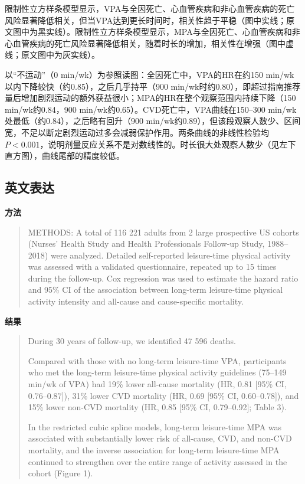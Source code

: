 限制性立方样条模型显示，VPA与全因死亡、心血管疾病和非心血管疾病的死亡风险显著降低相关，但当VPA达到更长时间时，相关性趋于平稳（图中实线；原文图中为黑实线）。限制性立方样条模型显示，MPA与全因死亡、心血管疾病和非心血管疾病的死亡风险显著降低相关，随着时长的增加，相关性在增强（图中虚线；原文图中为灰实线）。
\begin{annotation}
以“不运动”（0 min/wk）为参照读图：全因死亡中，VPA的HR在约150 min/wk以内下降较快（约0.85），之后几乎持平（900 min/wk时约0.80），即超过指南推荐量后增加剧烈运动的额外获益很小；MPA的HR在整个观察范围内持续下降（150 min/wk约0.84，900 min/wk约0.65）。CVD死亡中，VPA曲线在150--300 min/wk处最低（约0.84），之后略有回升（900 min/wk约0.89），但该段观察人数少、区间宽，不足以断定剧烈运动过多会减弱保护作用。两条曲线的非线性检验均 $P<0.001$，说明剂量反应关系不是对数线性的。时长很大处观察人数少（见左下直方图），曲线尾部的精度较低。
\end{annotation}
\subsection{英文表达}
\textbf{方法}
\begin{quote}
METHODS: A total of 116 221 adults from 2 large prospective US cohorts (Nurses' Health Study and Health Professionals Follow-up Study, 1988--2018) were analyzed. Detailed self-reported leisure-time physical activity was assessed with a validated questionnaire, repeated up to 15 times during the follow-up. Cox regression was used to estimate the hazard ratio and 95\% CI of the association between long-term leisure-time physical activity intensity and all-cause and cause-specific mortality.
\end{quote}
\textbf{结果}
\begin{quote}
During 30 years of follow-up, we identified 47 596 deaths.

Compared with those with no long-term leisure-time VPA, participants who met the long-term leisure-time physical activity guidelines (75--149 min/wk of VPA) had 19\% lower all-cause mortality (HR, 0.81 [95\% CI, 0.76--0.87]), 31\% lower CVD mortality (HR, 0.69 [95\% CI, 0.60--0.78]), and 15\% lower non-CVD mortality (HR, 0.85 [95\% CI, 0.79--0.92]; Table 3).

In the restricted cubic spline models, long-term leisure-time MPA was associated with substantially lower risk of all-cause, CVD, and non-CVD mortality, and the inverse association for long-term leisure-time MPA continued to strengthen over the entire range of activity assessed in the cohort (Figure 1).
\end{quote}
